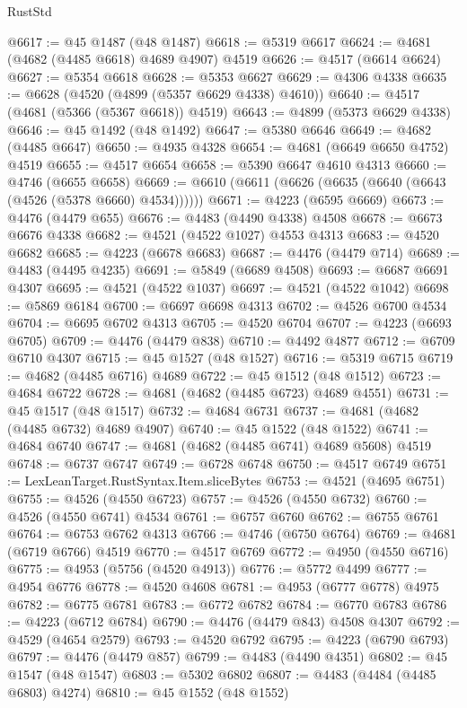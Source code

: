 \begin{lexlean}{RustStd}
\begin{coremodule}
@6617 := @45 @1487 (@48 @1487)
@6618 := @5319 @6617
@6624 := @4681 (@4682 (@4485 @6618) @4689 @4907) @4519
@6626 := @4517 (@6614 @6624)
@6627 := @5354 @6618
@6628 := @5353 @6627
@6629 := @4306 @4338
@6635 := @6628 (@4520 (@4899 (@5357 @6629 @4338) @4610))
@6640 := @4517 (@4681 (@5366 (@5367 @6618)) @4519)
@6643 := @4899 (@5373 @6629 @4338)
@6646 := @45 @1492 (@48 @1492)
@6647 := @5380 @6646
@6649 := @4682 (@4485 @6647)
@6650 := @4935 @4328
@6654 := @4681 (@6649 @6650 @4752) @4519
@6655 := @4517 @6654
@6658 := @5390 @6647 @4610 @4313
@6660 := @4746 (@6655 @6658)
@6669 := @6610 (@6611 (@6626 (@6635 (@6640 (@6643 (@4526 (@5378 @6660) @4534))))))
@6671 := @4223 (@6595 @6669)
@6673 := @4476 (@4479 @655)
@6676 := @4483 (@4490 @4338) @4508
@6678 := @6673 @6676 @4338
@6682 := @4521 (@4522 @1027) @4553 @4313
@6683 := @4520 @6682
@6685 := @4223 (@6678 @6683)
@6687 := @4476 (@4479 @714)
@6689 := @4483 (@4495 @4235)
@6691 := @5849 (@6689 @4508)
@6693 := @6687 @6691 @4307
@6695 := @4521 (@4522 @1037)
@6697 := @4521 (@4522 @1042)
@6698 := @5869 @6184
@6700 := @6697 @6698 @4313
@6702 := @4526 @6700 @4534
@6704 := @6695 @6702 @4313
@6705 := @4520 @6704
@6707 := @4223 (@6693 @6705)
@6709 := @4476 (@4479 @838)
@6710 := @4492 @4877
@6712 := @6709 @6710 @4307
@6715 := @45 @1527 (@48 @1527)
@6716 := @5319 @6715
@6719 := @4682 (@4485 @6716) @4689
@6722 := @45 @1512 (@48 @1512)
@6723 := @4684 @6722
@6728 := @4681 (@4682 (@4485 @6723) @4689 @4551)
@6731 := @45 @1517 (@48 @1517)
@6732 := @4684 @6731
@6737 := @4681 (@4682 (@4485 @6732) @4689 @4907)
@6740 := @45 @1522 (@48 @1522)
@6741 := @4684 @6740
@6747 := @4681 (@4682 (@4485 @6741) @4689 @5608) @4519
@6748 := @6737 @6747
@6749 := @6728 @6748
@6750 := @4517 @6749
@6751 := LexLeanTarget.RustSyntax.Item.sliceBytes
@6753 := @4521 (@4695 @6751)
@6755 := @4526 (@4550 @6723)
@6757 := @4526 (@4550 @6732)
@6760 := @4526 (@4550 @6741) @4534
@6761 := @6757 @6760
@6762 := @6755 @6761
@6764 := @6753 @6762 @4313
@6766 := @4746 (@6750 @6764)
@6769 := @4681 (@6719 @6766) @4519
@6770 := @4517 @6769
@6772 := @4950 (@4550 @6716)
@6775 := @4953 (@5756 (@4520 @4913))
@6776 := @5772 @4499
@6777 := @4954 @6776
@6778 := @4520 @4608
@6781 := @4953 (@6777 @6778) @4975
@6782 := @6775 @6781
@6783 := @6772 @6782
@6784 := @6770 @6783
@6786 := @4223 (@6712 @6784)
@6790 := @4476 (@4479 @843) @4508 @4307
@6792 := @4529 (@4654 @2579)
@6793 := @4520 @6792
@6795 := @4223 (@6790 @6793)
@6797 := @4476 (@4479 @857)
@6799 := @4483 (@4490 @4351)
@6802 := @45 @1547 (@48 @1547)
@6803 := @5302 @6802
@6807 := @4483 (@4484 (@4485 @6803) @4274)
@6810 := @45 @1552 (@48 @1552)

\end{coremodule}
\end{lexlean}

